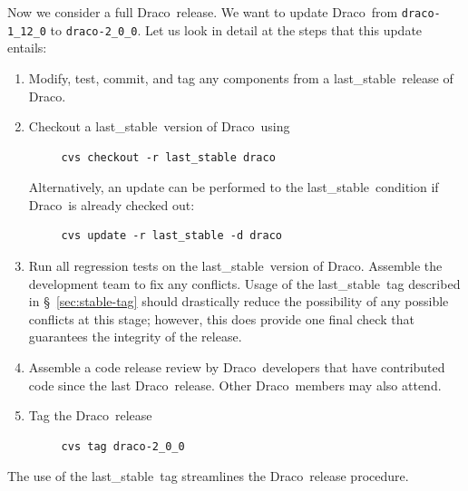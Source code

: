 \documentclass[11pt]{nmemo}
\newcommand{\draco}{{\normalfont\normalsize\sffamily Draco}}
\newcommand{\stable}{{\normalfont\normalsize\ttfamily last\_stable}}
\begin{document}
Now we consider a full \draco\ release.  We want to update \draco\
from \texttt{draco-1\_12\_0} to \texttt{draco-2\_0\_0}.  Let us look
in detail at the steps that this update entails:
\begin{enumerate}
\item Modify, test, commit, and tag any components from a \stable\ 
  release of \draco.
\item Checkout a \stable\ version of \draco\ using
\begin{verbatim}
     cvs checkout -r last_stable draco
\end{verbatim}
  Alternatively, an update can be performed to the \stable\ condition
  if \draco\ is already checked out:
\begin{verbatim}
     cvs update -r last_stable -d draco
\end{verbatim}
\item Run all regression tests on the \stable\ version of \draco.
  Assemble the development team to fix any conflicts.  Usage of the
  \stable\ tag described in \S~\ref{sec:stable-tag} should drastically 
  reduce the possibility of any possible conflicts at this stage;
  however, this does provide one final check that guarantees the
  integrity of the release.
\item Assemble a code release review by \draco\ developers that have
  contributed code since the last \draco\ release.  Other \draco\ 
  members may also attend.
\item Tag the \draco\ release
\begin{verbatim}
     cvs tag draco-2_0_0
\end{verbatim}
\end{enumerate}
The use of the \stable\ tag streamlines the \draco\ release procedure.
\end{document}
